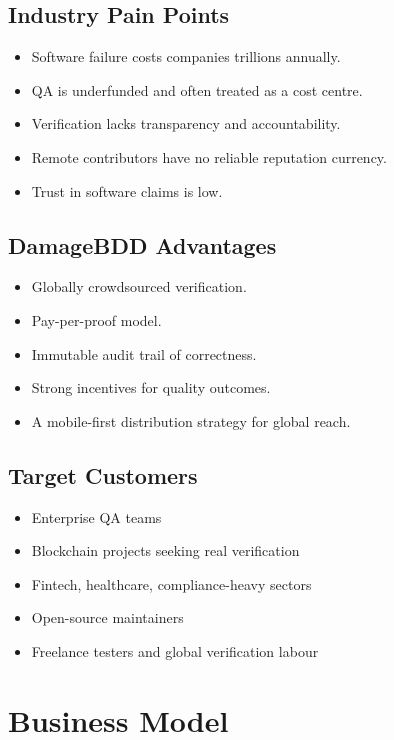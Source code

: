 \documentclass[12pt,a4paper]{article}
\begin{document}
\subsection{Industry Pain Points}

\begin{itemize}
    \item Software failure costs companies trillions annually.
    \item QA is underfunded and often treated as a cost centre.
    \item Verification lacks transparency and accountability.
    \item Remote contributors have no reliable reputation currency.
    \item Trust in software claims is low.
\end{itemize}

\subsection{DamageBDD Advantages}

\begin{itemize}
    \item Globally crowdsourced verification.
    \item Pay-per-proof model.
    \item Immutable audit trail of correctness.
    \item Strong incentives for quality outcomes.
    \item A mobile-first distribution strategy for global reach.
\end{itemize}

\subsection{Target Customers}

\begin{itemize}
    \item Enterprise QA teams
    \item Blockchain projects seeking real verification
    \item Fintech, healthcare, compliance-heavy sectors
    \item Open-source maintainers
    \item Freelance testers and global verification labour
\end{itemize}

\section{Business Model}
\end{document}
